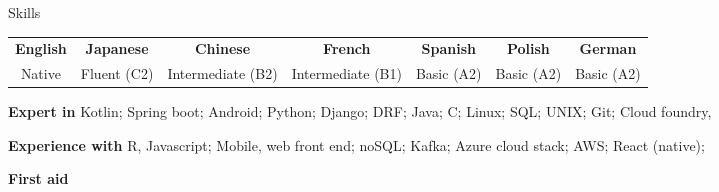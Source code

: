 \documentclass[10pt]{resume} %
\begin{document}
\begin{rSection}{Skills}

  \begin{center}
  \begin{tabular}{ c c c c c c c }
   \textbf{English} & \textbf{Japanese} & \textbf{Chinese} & \textbf{French} &
    \textbf{Spanish} & \textbf{Polish} & \textbf{German} \\
    Native & Fluent (C2) & Intermediate (B2) & Intermediate (B1) & Basic (A2) & Basic
    (A2) & Basic (A2)
  \end{tabular}
  \end{center}

  \item \textbf{Expert in}
    Kotlin;
    Spring boot;
    Android;
    Python;
    Django;
    DRF;
    Java;
    C;
    Linux;
    SQL;
    UNIX;
    Git;
    Cloud foundry,


  \item \textbf{Experience with}
    R,
    Javascript;
    Mobile, web front end;
    noSQL;
    Kafka;
    Azure cloud stack;
    AWS;
    React (native);



  \item \textbf{First aid}

\end{rSection}

\end{document}
